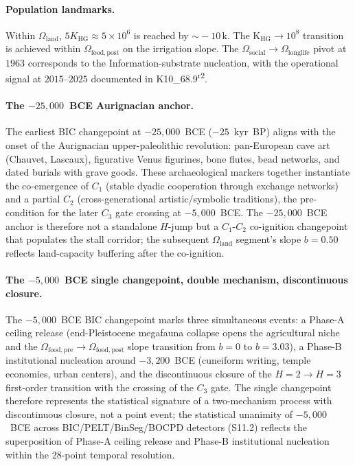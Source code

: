\documentclass[11pt]{article}
\begin{document}
\paragraph{Population landmarks.} Within $\Omega_{\mathrm{land}}$, $5K_{\mathrm{HG}}\!\approx\!5\times 10^{6}$ is reached by $\sim\!-10\,\mathrm{k}$. The K$_{\mathrm{HG}}\to 10^{8}$ transition is achieved within $\Omega_{\mathrm{food,post}}$ on the irrigation slope. The $\Omega_{\mathrm{social}}\to\Omega_{\mathrm{longlife}}$ pivot at $1963$ corresponds to the Information-substrate nucleation, with the operational signal at $2015$--$2025$ documented in K10\_68.9\textsuperscript{r2}.

\paragraph{The $-25{,}000$~BCE Aurignacian anchor.}\label{S-AurignacianAnchor}
The earliest BIC changepoint at $-25{,}000$~BCE ($-25$~kyr~BP) aligns with the onset of the Aurignacian upper-paleolithic revolution: pan-European cave art (Chauvet, Lascaux), figurative Venus figurines, bone flutes, bead networks, and dated burials with grave goods. These archaeological markers together instantiate the co-emergence of $C_1$ (stable dyadic cooperation through exchange networks) and a partial $C_2$ (cross-generational artistic/symbolic traditions), the pre-condition for the later $C_3$ gate crossing at $-5{,}000$~BCE. The $-25{,}000$~BCE anchor is therefore not a standalone $H$-jump but a $C_1$-$C_2$ co-ignition changepoint that populates the stall corridor; the subsequent $\Omega_{\mathrm{land}}$ segment's slope $b{=}0.50$ reflects land-capacity buffering after the co-ignition.

\paragraph{The $-5{,}000$~BCE single changepoint, double mechanism, discontinuous closure.}\label{S-MinusFiveKTripleClaim}
The $-5{,}000$~BCE BIC changepoint marks three simultaneous events: a Phase-A ceiling release (end-Pleistocene megafauna collapse opens the agricultural niche and the $\Omega_{\mathrm{food,pre}}\to\Omega_{\mathrm{food,post}}$ slope transition from $b{=}0$ to $b{=}3.03$), a Phase-B institutional nucleation around $-3{,}200$~BCE (cuneiform writing, temple economies, urban centers), and the discontinuous closure of the $H{=}2\to H{=}3$ first-order transition with the crossing of the $C_3$ gate. The single changepoint therefore represents the statistical signature of a two-mechanism process with discontinuous closure, not a point event; the statistical unanimity of $-5{,}000$~BCE across BIC/PELT/BinSeg/BOCPD detectors (S11.2) reflects the superposition of Phase-A ceiling release and Phase-B institutional nucleation within the 28-point temporal resolution.
\end{document}
